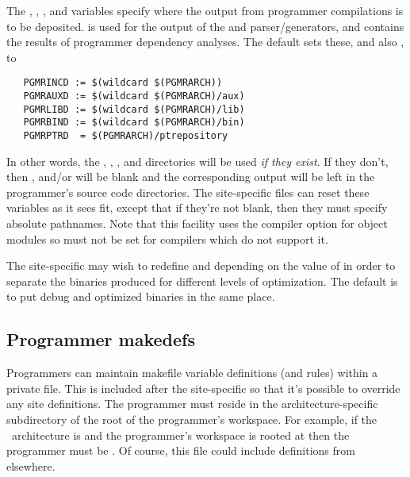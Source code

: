 The , , , and 
variables specify where the output from programmer compilations is to be
deposited.   is used for the output of the  and
 parser/generators, and  contains the results of
programmer dependency analyses.  The default  sets these, and
also , to

\begin{verbatim}
   PGMRINCD := $(wildcard $(PGMRARCH))
   PGMRAUXD := $(wildcard $(PGMRARCH)/aux)
   PGMRLIBD := $(wildcard $(PGMRARCH)/lib)
   PGMRBIND := $(wildcard $(PGMRARCH)/bin)
   PGMRPTRD  = $(PGMRARCH)/ptrepository
\end{verbatim}

\noindent
In other words, the , ,
, and  directories will be used
{\em if they exist}.  If they don't, then , 
and/or  will be blank and the corresponding output will be
left in the programmer's source code directories.  The site-specific
 files can reset these variables as it sees fit, except that
if they're not blank, then they must specify absolute pathnames.  Note that
this facility uses the  compiler option for object modules so
 must not be set for compilers which do not support it.

The site-specific  may wish to redefine  and
 depending on the value of  in order to separate the
binaries produced for different levels of optimization.  The default is to put
debug and optimized binaries in the same place.

\subsection*{Programmer makedefs}

Programmers can maintain makefile variable definitions (and rules) within a
private  file.  This is included after the site-specific
 so that it's possible to override any site definitions.  The
programmer  must reside in the architecture-specific
subdirectory of the root of the programmer's workspace.  For example, if the
\aipspp\ architecture is  and the programmer's workspace is
rooted at  then the programmer  must be
.  Of course, this file could
include  definitions from elsewhere.

